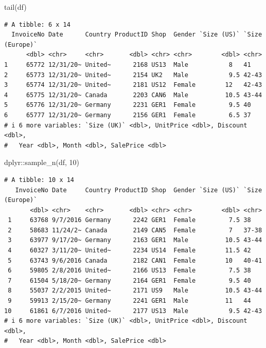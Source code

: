 \documentclass[
  letterpaper,
  DIV=11,
  numbers=noendperiod]{scrreprt}
\newenvironment{Shaded}{\begin{snugshade}}{\end{snugshade}}
\newcommand{\DecValTok}[1]{\textcolor[rgb]{0.68,0.00,0.00}{#1}}
\newcommand{\FunctionTok}[1]{\textcolor[rgb]{0.28,0.35,0.67}{#1}}
\newcommand{\NormalTok}[1]{\textcolor[rgb]{0.00,0.23,0.31}{#1}}
\newcommand{\SpecialCharTok}[1]{\textcolor[rgb]{0.37,0.37,0.37}{#1}}
\begin{document}
\begin{Shaded}
\begin{Highlighting}[]
\FunctionTok{tail}\NormalTok{(df)}
\end{Highlighting}
\end{Shaded}

\begin{verbatim}
# A tibble: 6 x 14
  InvoiceNo Date      Country ProductID Shop  Gender `Size (US)` `Size (Europe)`
      <dbl> <chr>     <chr>       <dbl> <chr> <chr>        <dbl> <chr>          
1     65772 12/31/20~ United~      2168 US13  Male           8   41             
2     65773 12/31/20~ United~      2154 UK2   Male           9.5 42-43          
3     65774 12/31/20~ United~      2181 US12  Female        12   42-43          
4     65775 12/31/20~ Canada       2203 CAN6  Male          10.5 43-44          
5     65776 12/31/20~ Germany      2231 GER1  Female         9.5 40             
6     65777 12/31/20~ Germany      2156 GER1  Female         6.5 37             
# i 6 more variables: `Size (UK)` <dbl>, UnitPrice <dbl>, Discount <dbl>,
#   Year <dbl>, Month <dbl>, SalePrice <dbl>
\end{verbatim}

\begin{Shaded}
\begin{Highlighting}[]
\NormalTok{dplyr}\SpecialCharTok{::}\FunctionTok{sample\_n}\NormalTok{(df, }\DecValTok{10}\NormalTok{)}
\end{Highlighting}
\end{Shaded}

\begin{verbatim}
# A tibble: 10 x 14
   InvoiceNo Date     Country ProductID Shop  Gender `Size (US)` `Size (Europe)`
       <dbl> <chr>    <chr>       <dbl> <chr> <chr>        <dbl> <chr>          
 1     63768 9/7/2016 Germany      2242 GER1  Female         7.5 38             
 2     58683 11/24/2~ Canada       2149 CAN5  Female         7   37-38          
 3     63977 9/17/20~ Germany      2163 GER1  Male          10.5 43-44          
 4     60327 3/11/20~ United~      2234 US14  Female        11.5 42             
 5     63743 9/6/2016 Canada       2182 CAN1  Female        10   40-41          
 6     59805 2/8/2016 United~      2166 US13  Female         7.5 38             
 7     61504 5/18/20~ Germany      2164 GER1  Female         9.5 40             
 8     55037 2/2/2015 United~      2171 US9   Male          10.5 43-44          
 9     59913 2/15/20~ Germany      2241 GER1  Male          11   44             
10     61861 6/7/2016 United~      2177 US13  Male           9.5 42-43          
# i 6 more variables: `Size (UK)` <dbl>, UnitPrice <dbl>, Discount <dbl>,
#   Year <dbl>, Month <dbl>, SalePrice <dbl>
\end{verbatim}
\end{document}

